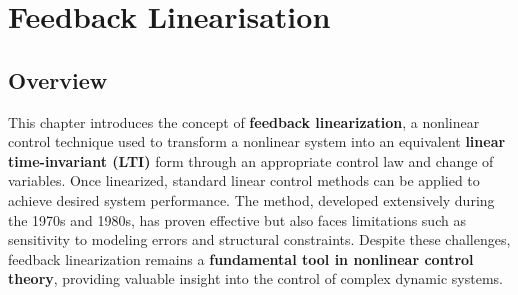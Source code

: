 \chapterspaceabove{6.75cm} %
\chapterspacebelow{7.25cm} %

\chapter{Feedback Linearisation}
\section{Overview}
This chapter introduces the concept of \textbf{feedback linearization}, a nonlinear control technique used to transform a nonlinear system into an equivalent \textbf{linear time-invariant (LTI)} form through an appropriate control law and change of variables. Once linearized, standard linear control methods can be applied to achieve desired system performance. The method, developed extensively during the 1970s and 1980s, has proven effective but also faces limitations such as sensitivity to modeling errors and structural constraints. Despite these challenges, feedback linearization remains a \textbf{fundamental tool in nonlinear control theory}, providing valuable insight into the control of complex dynamic systems.